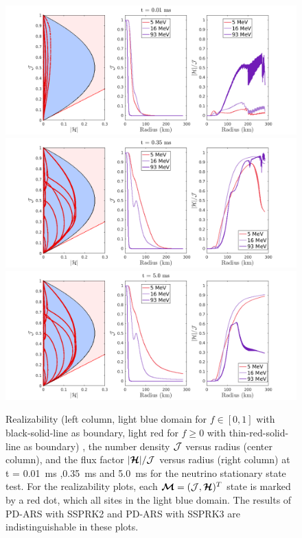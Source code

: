 \begin{figure}[h]
  \centering
    \includegraphics[width=\textwidth]{figures/NSS_1_1}\\
    \includegraphics[width=\textwidth]{figures/NSS_3_1} \\
    \includegraphics[width=\textwidth]{figures/NSS_5_1} \\
    \caption{Realizability (left column, light blue domain for $f \in [0,1]$ with black-solid-line as boundary, light red for $f\geq 0$ with thin-red-solid-line as boundary) , the number density $\mathcal{J}$ versus radius (center column), and the flux factor $|\boldsymbol{\mathcal{H}}|/\mathcal{J}$ versus radius (right column) at t = 0.01~ms ,0.35~ms and 5.0~ms for the neutrino stationary state test. For the realizability plots, each $\boldsymbol{\mathcal{M}}=(\mathcal{J},\boldsymbol{\mathcal{H}})^{T}$ state is marked by a red dot, which all sites in the light blue domain. The results of PD-ARS with SSPRK2 and PD-ARS with SSPRK3 are indistinguishable in these plots.}
    \label{fig:NeutrinoStationaryTestEvolve}
\end{figure}

\clearpage